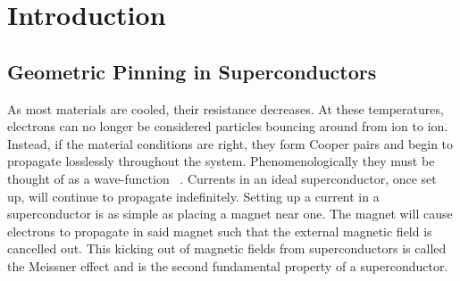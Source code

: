 \chapter{Introduction}		%
\label{introchap}

\label{section}

\section{Geometric Pinning in Superconductors}

As most materials are cooled, their resistance decreases. At these temperatures, electrons can no longer be considered particles bouncing around from ion to ion. Instead, if the material conditions are right, they form Cooper pairs and begin to propagate losslessly throughout the system. Phenomenologically they must be thought of as a wave-function ~\cite{Miszczak15}. Currents in an ideal superconductor, once set up, will continue to propagate indefinitely. Setting up a current in a superconductor is as simple as placing a magnet near one. The magnet will cause electrons to propagate in said magnet such that the external magnetic field is cancelled out. This kicking out of magnetic fields from superconductors is called the Meissner effect and is the second fundamental property of a superconductor.

